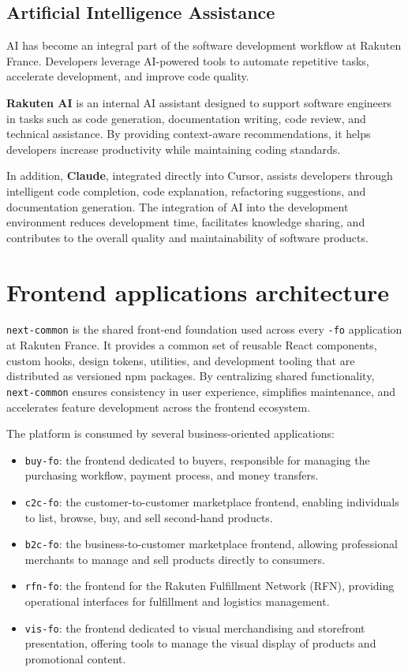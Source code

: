 \subsection{Artificial Intelligence Assistance}

\acf{AI} has become an integral part of the software development workflow at Rakuten France. Developers leverage \acs{AI}-powered tools to automate repetitive tasks, accelerate development, and improve code quality.

\textbf{Rakuten AI} is an internal \acs{AI} assistant designed to support software engineers in tasks such as code generation, documentation writing, code review, and technical assistance. By providing context-aware recommendations, it helps developers increase productivity while maintaining coding standards.

In addition, \textbf{Claude}, integrated directly into Cursor, assists developers through intelligent code completion, code explanation, refactoring suggestions, and documentation generation. The integration of \acs{AI} into the development environment reduces development time, facilitates knowledge sharing, and contributes to the overall quality and maintainability of software products.

\section{Frontend applications architecture}

\lstinline|next-common| is the shared front-end foundation used across every \texttt{-fo} application at Rakuten France. It provides a common set of reusable React components, custom hooks, design tokens, utilities, and development tooling that are distributed as versioned npm packages. By centralizing shared functionality, \lstinline|next-common| ensures consistency in user experience, simplifies maintenance, and accelerates feature development across the frontend ecosystem.

The platform is consumed by several business-oriented applications:
\begin{itemize}
    \item \lstinline|buy-fo|: the frontend dedicated to buyers, responsible for managing the purchasing workflow, payment process, and money transfers.
    \item \lstinline|c2c-fo|: the customer-to-customer marketplace frontend, enabling individuals to list, browse, buy, and sell second-hand products.
    \item \lstinline|b2c-fo|: the business-to-customer marketplace frontend, allowing professional merchants to manage and sell products directly to consumers.
    \item \lstinline|rfn-fo|: the frontend for the Rakuten Fulfillment Network (RFN), providing operational interfaces for fulfillment and logistics management.
    \item \lstinline|vis-fo|: the frontend dedicated to visual merchandising and storefront presentation, offering tools to manage the visual display of products and promotional content.
\end{itemize}


